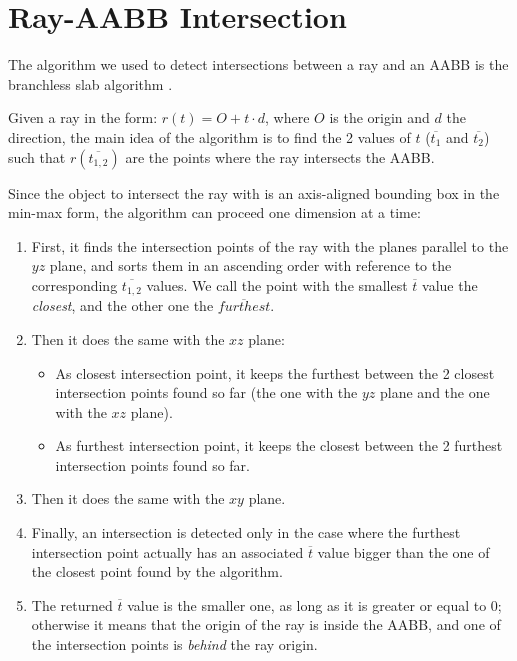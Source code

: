 \documentclass{PoliMi_MasterThesis}
\begin{document}
\section{Ray-AABB Intersection} \label{sec:ray_box_intersection}
The algorithm we used to detect intersections between a ray and an AABB is the branchless slab algorithm \cite{ray_box_intersection}.

Given a ray in the form: $r(t) = O + t\cdot d$, where $O$ is the origin and $d$ the direction, the main idea of the algorithm is to find the 2 values of $t$ ($\overline{t_1}$ and $\overline{t_2}$) such that $r(\overline{t_{1,2}})$ are the points where the ray intersects the AABB.

Since the object to intersect the ray with is an axis-aligned bounding box in the min-max form, the algorithm can proceed one dimension at a time:
\begin{enumerate}
	\item First, it finds the intersection points of the ray with the planes parallel to the $yz$ plane, and sorts them in an ascending order with reference to the corresponding $\overline{t_{1,2}}$ values. We call the point with the smallest $\overline{t}$ value the \textit{closest}, and the other one the $\overline{furthest}$.
	\item Then it does the same with the $xz$ plane:
	\begin{itemize}
		\item As closest intersection point, it keeps the furthest between the 2 closest intersection points found so far (the one with the $yz$ plane and the one with the $xz$ plane).
		\item As furthest intersection point, it keeps the closest between the 2 furthest intersection points found so far.
	\end{itemize}
	\item Then it does the same with the $xy$ plane.
	\item Finally, an intersection is detected only in the case where the furthest intersection point actually has an associated $\overline{t}$ value bigger than the one of the closest point found by the algorithm.
	\item The returned $\overline{t}$ value is the smaller one, as long as it is greater or equal to 0; otherwise it means that the origin of the ray is inside the AABB, and one of the intersection points is \textit{behind} the ray origin.
\end{enumerate}
	
\end{document}
